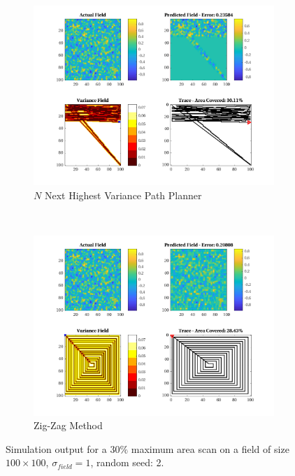 \begin{figure}[htb!]
\begin{subfigure}[t]{0.5\textwidth}
    \end{subfigure}%
    \\
    \begin{subfigure}[t]{0.5\textwidth}
        \centering
        \includegraphics[width=\linewidth]{figures/hbresults/nnhv_30p_100x100_sf_1_seed_2.png}
        \captionsetup{skip=0.10\baselineskip,size=footnotesize}
        \caption{$N$ Next Highest Variance Path Planner}
    \end{subfigure}%
    ~
    \begin{subfigure}[t]{0.5\textwidth}
        \centering
        \includegraphics[width=\linewidth]{figures/hbresults/zz_30p_100x100_sf_1_seed_2.png}
        \captionsetup{skip=0.10\baselineskip,size=footnotesize}
        \caption{Zig-Zag Method}
    \end{subfigure}%
    \captionsetup{skip=0.20\baselineskip}
    \caption{Simulation output for a $30\%$ maximum area scan on a field of size $100 \times 100$, $\sigma_{field} = 1$, random seed: 2.}
    \label{fig:sim_sigma1_p30_s2}
\end{figure}